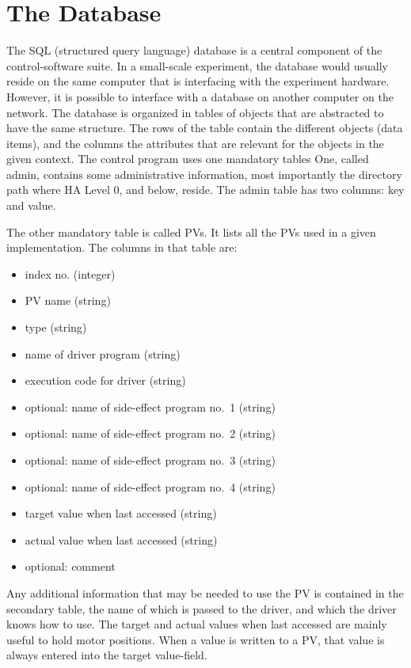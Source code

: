 \documentclass[10pt]{revtex4}
\begin{document}
\section{The Database}
The SQL (structured query language) database is a central component of the
control-software suite.
In a small-scale experiment, the database would usually reside on the
same computer that is interfacing with the experiment hardware.
However, it is possible to interface with a database on another
computer on the network.
The database is organized in tables of objects that are abstracted to
have the same structure.
The rows of the table contain the different objects (data items), and
the columns the attributes that are relevant for the objects in the
given context.
The control program uses one mandatory tables
One, called admin, contains some administrative information, most
importantly the directory path where HA Level 0, and below, reside.
The admin table has two columns: key and value.
\par
The other mandatory table is called PVs.
It lists all the PVs used in a given implementation.
The columns in that table are:
\begin{itemize}
\item index no. (integer)
\item PV name (string)
\item type (string)
\item name of driver program (string)
\item execution code for driver (string)
\item optional: name of side-effect program no.\ 1 (string)
\item optional: name of side-effect program no.\ 2 (string)
\item optional: name of side-effect program no.\ 3 (string)
\item optional: name of side-effect program no.\ 4 (string)
\item target value when last accessed (string)
\item actual value when last accessed (string)
\item optional: comment
\end{itemize}
Any additional information that may be needed to use the PV is
contained in the secondary table, the name of which is passed to the
driver, and which the driver knows how to use.
The target and actual values when last accessed are mainly useful
to hold motor positions.
When a value is written to a PV, that value is always entered into the
target value-field.
\end{document}
